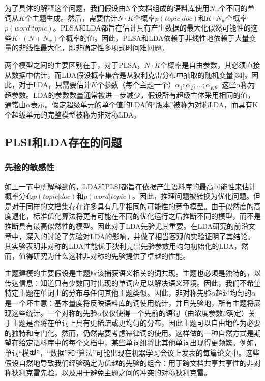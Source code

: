 为了具体的解释这个问题，我们假设由N个文档组成的语料库使用$N_w$个不同的单词从$K$个主题生成。然后，需要估计$N \cdot K$个概率$p(topic|doc)$和$K \cdot N_w$个概率$p(word|topic)$。PLSA和LDA都旨在估计具有产生数据的最大化似然可能性的这些$K \cdot (N + N_w)$个概率的值\cite{PLSI}\cite{LDA}。因此，PLSA和LDA依赖于非线性地依赖于大量变量的非线性最大化，即非确定性多项式时间难问题。

两个模型之间的主要区别在于，对于PLSA，$N \cdot K$个概率是自由参数，其必须直接从数据中估计，而LDA假设概率集合是从狄利克雷分布中抽取的随机变量[34]。因此，对于LDA，只需要估计$K$个参数（每个主题一个）{$\alpha_1; \alpha_2; ...; \alpha_K$}。这些$\alpha$称为超参数。LDA的参数数量通常被进一步减少，假设所有超级主体采用相同的值，通常由$\alpha$表示。假定超级单元的单个值的LDA的“版本”被称为对称LD​​A，而具有K个超级单元的完整模型被称为非对称LDA\cite{ComplexityOfLDA}。
\subsection{PLSI和LDA存在的问题}
\subsubsection{先验的敏感性}
如上一节中所解释到的，LDA和PLSI都旨在依据产生语料库的最高可能性来估计概率分布$p(topic|doc)$和$p(word|topic)$。因此，推理问题被转换为优化问题\cite{ProbabilisticTopicModels}。但是对于同样的文档集存在许多具有几乎相同的可能性的竞争模型。由于似然度的高度退化，标准优化算法将更有可能在不同的优化运行之后推断不同的模型，而不是推断具有最高似然性的模型。因此对于LDA先验尤其重要。在LDA研究的前沿文章\cite{RethinkingLDA}中，深入的讨论了先验对LDA的影响，并做了相当客观的实验证明了其结论。其实验表明非对称的LDA性能优于狄利克雷先验参数用均匀初始化的LDA，然而，值得研究为什么这种非对称的先验提供了卓越的性能。

主题建模的主要假设是主题应该捕获语义相关的词共现。主题也必须是独特的，以传达信息：知道只有少数同时出现的单词应足以解决语义环境。因此，我们不希望特定主题在单词上的分布与任何其他主题类似。因此，非对称先验$\alpha$超过均匀的$\alpha$是一个坏主意：基本量度将反映语料库的词使用统计，并且先验地，所有主题将展现这些统计。一个对称的先验$\alpha$仅仅使得一个先前的语句（由浓度参数$\beta$确定）关于主题是否将在单词上具有更稀疏或更均匀的分布，因此主题可以自由地作为必要的独特和专门化。然而，仍然需要考虑幂律词的使用。这样做的一种自然方式是期望在给定语料库中的每个文档中，某些单词组将比其他单词出现得更频繁。例如，单词“模型”，“数据”和“算法”可能出现在机器学习会议上发表的每篇论文中。这些假设自然地导致我们经验确定为优越的先验的组合：用于跨文档共享共享性的非对称狄利克雷先验，以及用于避免主题之间的冲突的对称狄利克雷。

